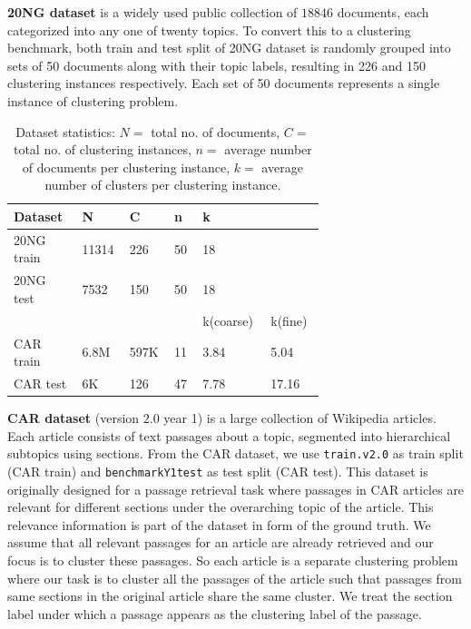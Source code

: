 \documentclass[11pt,a4paper]{article}
\begin{document}
\textbf{20NG dataset} is a widely used public collection of $18846$ documents, each categorized into any one of twenty topics. To convert this to a clustering benchmark, both train and test split of 20NG dataset is randomly grouped into sets of 50 documents along with their topic labels, resulting in 226 and 150 clustering instances respectively. Each set of 50 documents represents a single instance of clustering problem.
\begin{table}[t]
\begin{small}
\caption{Dataset statistics: $N=$ total no. of documents, $C=$ total no. of clustering instances, $n=$ average number of documents per clustering instance, $k=$ average number of clusters per clustering instance.}
\begin{tabular}{p{0.18\linewidth}p{0.08\linewidth}p{0.08\linewidth}p{0.08\linewidth}p{0.13\linewidth}p{0.13\linewidth}}
\hline
Dataset & N & C & n & k & \\ \hline
20NG train & 11314 & 226 & 50 & 18 & \\
20NG test  & 7532 & 150 & 50 & 18 & \\ \hline
&&&& k(coarse) & k(fine) \\ \hline
CAR train  & 6.8M & 597K & 11 & 3.84 & 5.04 \\
CAR test   & 6K & 126 & 47 & 7.78 & 17.16  
\end{tabular}
\label{tab:dat20ng}
\end{small}
\end{table}

\textbf{CAR dataset} (version $2.0$ year 1) is a large collection of Wikipedia articles. Each article consists of text passages about a topic, segmented into hierarchical subtopics using sections. From the CAR dataset, we use \texttt{train.v2.0} as train split (CAR train) and \texttt{benchmarkY1test} as test split (CAR test).  This dataset is originally designed for a passage retrieval task where passages in CAR articles are relevant for different sections under the overarching topic of the article. This relevance information is part of the dataset in form of the ground truth. We assume that all relevant passages for an article are already retrieved and our focus is to cluster these passages. So each article is a separate clustering problem where our task is to cluster all the passages of the article such that passages from same sections in the original article share the same cluster. We treat the section label under which a passage appears as the clustering label of the passage.
\end{document}
